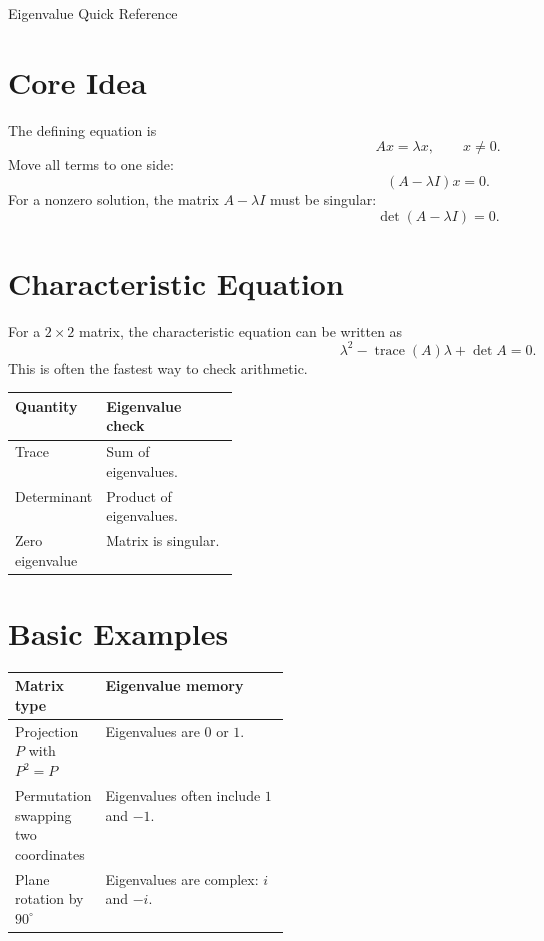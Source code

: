 \documentclass[10pt]{article}
\begin{document}
\begin{center}
{\LARGE Eigenvalue Quick Reference\par}
\end{center}

\section{Core Idea}


The defining equation is
\[
Ax=\lambda x,
\qquad x\ne0.
\]
Move all terms to one side:
\[
(A-\lambda I)x=0.
\]
For a nonzero solution, the matrix \(A-\lambda I\) must be singular:
\[
\det(A-\lambda I)=0.
\]

\section{Characteristic Equation}

For a \(2\times2\) matrix, the characteristic equation can be written as
\[
\lambda^2-\operatorname{trace}(A)\lambda+\det A=0.
\]
This is often the fastest way to check arithmetic.

\begin{center}
\small
\begin{tabularx}{\linewidth}{@{}L{0.26\linewidth}Y@{}}
\toprule
Quantity & Eigenvalue check \\
\midrule
Trace & Sum of eigenvalues. \\
Determinant & Product of eigenvalues. \\
Zero eigenvalue & Matrix is singular. \\
\bottomrule
\end{tabularx}
\end{center}

\section{Basic Examples}

\begin{center}
\small
\begin{tabularx}{\linewidth}{@{}L{0.32\linewidth}Y@{}}
\toprule
Matrix type & Eigenvalue memory \\
\midrule
Projection \(P\) with \(P^2=P\) & Eigenvalues are \(0\) or \(1\). \\
Permutation swapping two coordinates & Eigenvalues often include \(1\) and \(-1\). \\
Plane rotation by \(90^\circ\) & Eigenvalues are complex: \(i\) and \(-i\). \\
\bottomrule
\end{tabularx}
\end{center}
\end{document}
